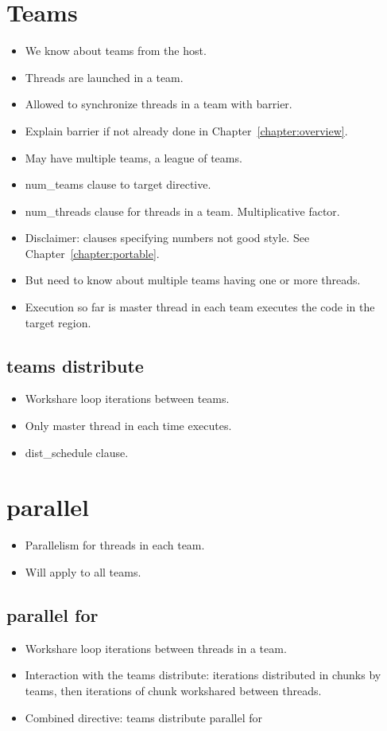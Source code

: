 \section{Teams}
\begin{itemize}
  \item We know about teams from the host.
  \item Threads are launched in a team.
  \item Allowed to synchronize threads in a team with barrier.
  \item Explain barrier if not already done in Chapter~\ref{chapter:overview}.
  \item May have multiple teams, a league of teams.
  \item num\_teams clause to target directive.
  \item num\_threads clause for threads in a team. Multiplicative factor.
  \item Disclaimer: clauses specifying numbers not good style. See Chapter~\ref{chapter:portable}.
  \item But need to know about multiple teams having one or more threads.
  \item Execution so far is master thread in each team executes the code in the target region.
\end{itemize}

\subsection{teams distribute}
\begin{itemize}
  \item Workshare loop iterations between teams.
  \item Only master thread in each time executes.
  \item dist\_schedule clause.
\end{itemize}

\section{parallel}
\begin{itemize}
  \item Parallelism for threads in each team.
  \item Will apply to all teams.
\end{itemize}

\subsection{parallel for}
\begin{itemize}
  \item Workshare loop iterations between threads in a team.
  \item Interaction with the teams distribute: iterations distributed in chunks by teams, then iterations of chunk workshared between threads.
  \item Combined directive: teams distribute parallel for
\end{itemize}


